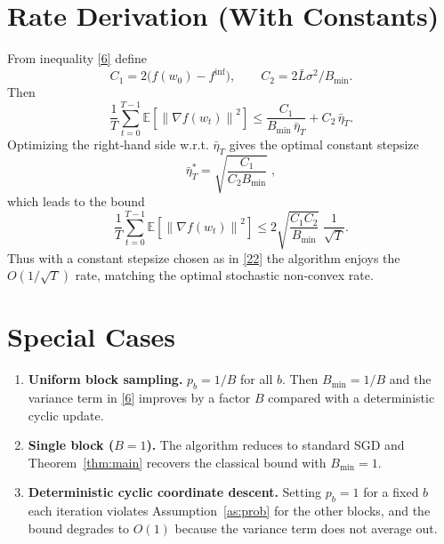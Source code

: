 \documentclass{article}
\newcommand{\E}{\mathbb{E}}
\newcommand{\norm}[1]{\left\|#1\right\|}
\begin{document}
\section*{Rate Derivation (With Constants)}
From inequality \eqref{6} define
\[
C_{1}=2\bigl(f(w_{0})-f^{\inf}\bigr),\qquad
C_{2}=2\bar L\sigma^{2}/B_{\min}.
\]
Then
\[
\frac{1}{T}\sum_{t=0}^{T-1}\E\!\left[\norm{\nabla f(w_{t})}^{2}\right]
\le \frac{C_{1}}{B_{\min}\,\bar\eta_{T}}+C_{2}\,\bar\eta_{T}.
\tag{21}
\]
Optimizing the right‑hand side w.r.t. $\bar\eta_{T}$ gives the optimal constant stepsize
\[
\bar\eta_{T}^{*}= \sqrt{\frac{C_{1}}{C_{2}B_{\min}}}\;,
\tag{22}
\]
which leads to the bound
\[
\frac{1}{T}\sum_{t=0}^{T-1}\E\!\left[\norm{\nabla f(w_{t})}^{2}\right]
\le 2\sqrt{\frac{C_{1}C_{2}}{B_{\min}}}\; \frac{1}{\sqrt{T}}.
\tag{23}
\]
Thus with a constant stepsize chosen as in \eqref{22} the algorithm enjoys the $O(1/\sqrt{T})$ rate, matching the optimal stochastic non‑convex rate.

\section*{Special Cases}
\begin{enumerate}
\item \textbf{Uniform block sampling.} $p_{b}=1/B$ for all $b$. Then $B_{\min}=1/B$ and the variance term in \eqref{6} improves by a factor $B$ compared with a deterministic cyclic update.
\item \textbf{Single block ($B=1$).} The algorithm reduces to standard SGD and Theorem~\ref{thm:main} recovers the classical bound with $B_{\min}=1$.
\item \textbf{Deterministic cyclic coordinate descent.} Setting $p_{b}=1$ for a fixed $b$ each iteration violates Assumption~\ref{as:prob} for the other blocks, and the bound degrades to $O(1)$ because the variance term does not average out.
\end{enumerate}
\end{document}
